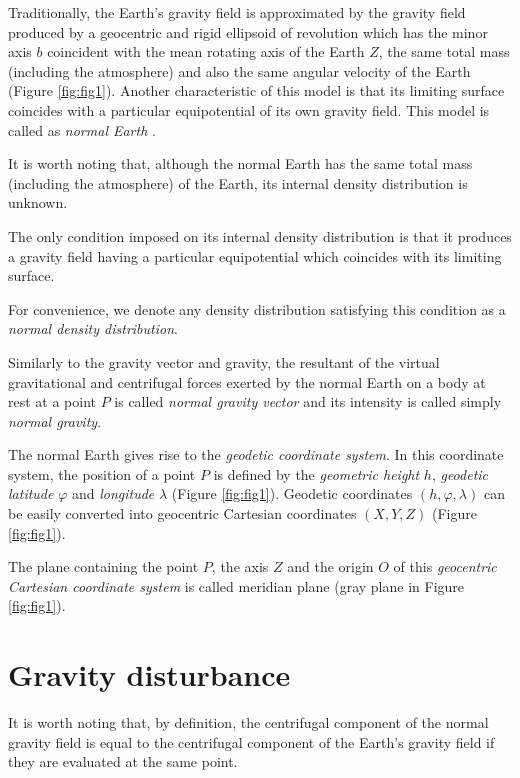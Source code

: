 \documentclass[manuscript]{geophysics}
\begin{document}
Traditionally, the Earth's gravity field is approximated 
by the gravity field produced by a geocentric and rigid ellipsoid 
of revolution which has the minor axis $b$ 
coincident with the mean rotating axis of the Earth $Z$, the 
same total mass (including the atmosphere) and also the
same angular velocity of the Earth (Figure \ref{fig:fig1}).
Another characteristic of this model is that its
limiting surface coincides with a particular equipotential 
of its own gravity field.
This model is called as \textit{normal Earth} 
\citep{vanicek1987, hofmann-wellenhof-moritz2005, torge2012}.


It is worth noting that, although the normal Earth has the
same total mass (including the atmosphere) of the Earth,
its internal density distribution is unknown.


The only condition imposed on its internal density
distribution is that it produces a gravity field
having a particular equipotential which coincides
with its limiting surface.


For convenience, we denote any density distribution 
satisfying this condition as a \textit{normal density distribution}.


Similarly to the gravity vector and gravity, 
the resultant of the virtual 
gravitational and centrifugal forces exerted by the normal
Earth on a body at rest at a point $P$ is called 
\textit{normal gravity vector} and its intensity is called 
simply \textit{normal gravity}.


The normal Earth gives rise to the \textit{geodetic coordinate system}.
In this coordinate system, the position of a point $P$
is defined by the \textit{geometric height} $h$, 
\textit{geodetic latitude}
$\varphi$ and \textit{longitude} $\lambda$ (Figure \ref{fig:fig1}).
Geodetic coordinates $(h, \varphi, \lambda)$ can be easily 
converted into geocentric Cartesian coordinates $(X, Y, Z)$
(Figure \ref{fig:fig1}).


The plane containing the point $P$, the axis $Z$ and
the origin $O$ of this \textit{geocentric Cartesian coordinate system}
is called meridian plane (gray plane in Figure \ref{fig:fig1}).


\section{Gravity disturbance}


It is worth noting that, by definition, 
the centrifugal component of the normal gravity field is
equal to the centrifugal component of the Earth's gravity
field if they are evaluated at the same point.
\end{document}
